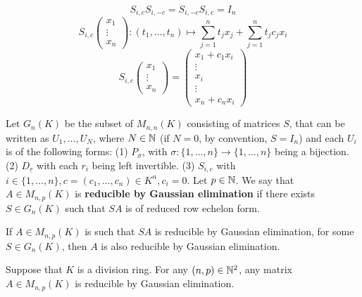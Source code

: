 \documentclass{book}
\numberwithin{equation}{section}
\begin{document}
\begin{box2}
    $$S_{i,c}S_{i,-c}=S_{i,-c}S_{i,c}=I_n$$
    $$S_{i,c}\begin{pmatrix}
 x_1\\
 \vdots\\
x_n
\end{pmatrix}:\left ( t_1,\dots,t_n \right ) \longmapsto\sum_{j=1}^{n}t_jx_j+\sum_{j=1}^{n} t_jc_jx_i $$
$$S_{i,c}\begin{pmatrix}
 x_1\\
 \vdots\\
x_n
\end{pmatrix}=\begin{pmatrix}
 x_1+c_1x_i\\
 \vdots\\
 x_i\\
 \vdots\\
x_n+c_nx_i
\end{pmatrix}$$
\end{box2}
\begin{definitionenv}
    Let $G_n(K)$ be the subset of $M_{n,n}(K)$ consisting of matrices $S$, that can be written as $U_1,\dots,U_N$, where $N\in\mathbb{N}$ (if $N=0$, by convention, $S=I_n$) and each $U_i$ is of the following forms:
    \newline
    (1) $P_\sigma$, with $\sigma:\{1,\dots,n\}\rightarrow\{1,\dots,n\}$ being a bijection.
    \newline
    (2) $D_{\underline{r}}$ with each $r_i$ being left invertible.
    \newline
    (3) $S_{i,c}$ with $i\in \{1,\dots,n\},c=\left(c_1,\dots,c_n\right)\in K^n,c_i=0$.
    \newline
    Let $p\in\mathbb{N}$. We say that $A\in M_{n,p}(K)$ is \textbf{reducible by Gaussian elimination} if there exists $S\in G_n(K)$ such that $SA$ is of reduced row echelon form.
\end{definitionenv}
\begin{lemmaenv}
    If $A\in M_{n,p}(K)$ is such that $SA$ is reducible by Gaussian elimination, for some $S\in G_n(K)$, then $A$ is also reducible by Gaussian elimination.
\end{lemmaenv}
\begin{theoremenv}
    Suppose that $K$ is a division ring. For any $(n,p)\in\mathbb{N}^2$, any matrix $A\in M_{n,p}(K)$ is reducible
    by Gaussian elimination.
\end{theoremenv}
\end{document}
